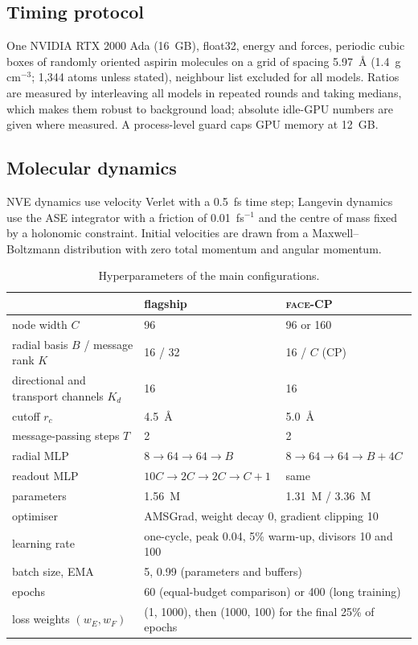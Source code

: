 \documentclass[journal=jctcce,manuscript=article,layout=traditional]{achemso}
\newcommand{\FACE}{\textup{\textsc{face}}}
\begin{document}
\subsection{Timing protocol}
One NVIDIA RTX 2000 Ada (16~GB), float32, energy and forces, periodic cubic boxes of randomly
oriented aspirin molecules on a grid of spacing 5.97~\AA{} (1.4~g\,cm$^{-3}$; 1,344 atoms unless stated), neighbour
list excluded for all models. Ratios are measured by interleaving all models in repeated rounds and taking medians,
which makes them robust to background load; absolute idle-GPU numbers are given where measured. A process-level guard
caps GPU memory at 12~GB.

\subsection{Molecular dynamics}
NVE dynamics use velocity Verlet with a 0.5~fs time step; Langevin dynamics use the ASE
integrator with a friction of 0.01~fs$^{-1}$ and the centre of mass fixed by a holonomic constraint. Initial velocities are drawn from a Maxwell--Boltzmann distribution
with zero total momentum and angular momentum.

\begin{table}
\caption{Hyperparameters of the main configurations.}
\label{tab:hyper}
\small
\begin{tabular}{lll}
\toprule
 & flagship & \FACE-CP \\
\midrule
node width $C$ & 96 & 96 or 160 \\
radial basis $B$ / message rank $K$ & 16 / 32 & 16 / $C$ (CP) \\
directional and transport channels $K_d$ & 16 & 16 \\
cutoff $r_c$ & 4.5~\AA & 5.0~\AA \\
message-passing steps $T$ & 2 & 2 \\
radial MLP & $8\to64\to64\to B$ & $8\to64\to64\to B+4C$ \\
readout MLP & $10C\to2C\to2C\to C+1$ & same \\
parameters & 1.56~M & 1.31~M / 3.36~M \\
\midrule
optimiser & \multicolumn{2}{l}{AMSGrad, weight decay 0, gradient clipping 10} \\
learning rate & \multicolumn{2}{l}{one-cycle, peak 0.04, 5\% warm-up, divisors 10 and 100} \\
batch size, EMA & \multicolumn{2}{l}{5, 0.99 (parameters and buffers)} \\
epochs & \multicolumn{2}{l}{60 (equal-budget comparison) or 400 (long training)} \\
loss weights $(w_E,w_F)$ & \multicolumn{2}{l}{(1, 1000), then (1000, 100) for the final 25\% of epochs} \\
\bottomrule
\end{tabular}
\end{table}
\end{document}
